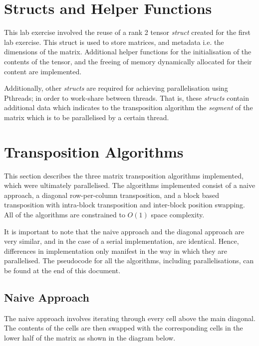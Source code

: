 \documentclass[journal,10pt]{IEEEtran}
\begin{document}

\section {Structs and Helper Functions}

This lab exercise involved the reuse of a rank 2 tensor \textit{struct} created for the first lab exercise. This struct is used to store matrices, and metadata i.e. the dimensions of the matrix. Additional helper functions for the initialisation of the contents of the tensor, and the freeing of memory dynamically allocated for their content are implemented.

Additionally, other \textit{structs} are required for achieving parallelisation using Pthreads; in order to work-share between threads. That is, these \textit{structs} contain additional data which indicates to the transposition algorithm the \textit{segment} of the matrix which is to be parallelised by a certain thread.





\section{Transposition Algorithms}

This section describes the three matrix transposition algorithms implemented, which were ultimately parallelised. The algorithms implemented consist of a naive approach, a diagonal row-per-column transposition, and a block based transposition with intra-block transposition and inter-block position swapping. All of the algorithms are constrained to $O(1)$ space complexity.

It is important to note that the naive approach and the diagonal approach are very similar, and in the case of a serial implementation, are identical. Hence, differences in implementation only manifest in the way in which they are parallelised. The pseudocode for all the algorithms, including parallelisations, can be found at the end of this document.

\subsection{Naive Approach}
The naive approach involves iterating through every cell above the main diagonal. The contents of the cells are then swapped with the corresponding cells in the lower half of the matrix as shown in the diagram below.
\end{document}
